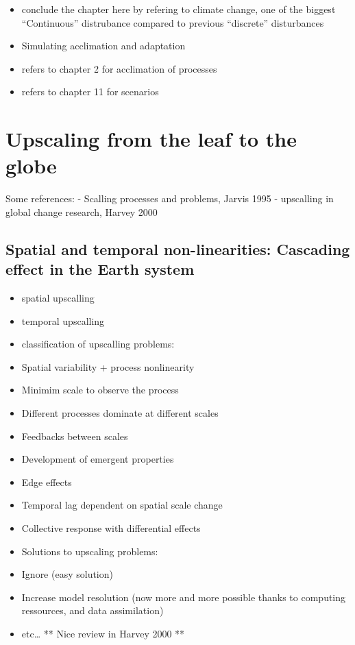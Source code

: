 \documentclass[12pt,oneside]{book}
\providecommand{\tightlist}{%
  \setlength{\itemsep}{0pt}\setlength{\parskip}{0pt}}
\begin{document}
\begin{itemize}
\tightlist
\item
  conclude the chapter here by refering to climate change, one of the
  biggest ``Continuous'' distrubance compared to previous ``discrete''
  disturbances
\item
  Simulating acclimation and adaptation
\item
  refers to chapter 2 for acclimation of processes
\item
  refers to chapter 11 for scenarios
\end{itemize}

\chapter{Upscaling from the leaf to the
globe}\label{upscaling-from-the-leaf-to-the-globe}

 Some references: - Scalling processes and problems,
Jarvis 1995 - upscalling in global change research, Harvey 2000

\section{Spatial and temporal non-linearities: Cascading effect in the
Earth
system}\label{spatial-and-temporal-non-linearities-cascading-effect-in-the-earth-system}

\begin{itemize}
\tightlist
\item
  spatial upscalling
\item
  temporal upscalling
\item
  classification of upscalling problems:
\item
  Spatial variability + process nonlinearity
\item
  Minimim scale to observe the process
\item
  Different processes dominate at different scales
\item
  Feedbacks between scales
\item
  Development of emergent properties
\item
  Edge effects
\item
  Temporal lag dependent on spatial scale change
\item
  Collective response with differential effects
\item
  Solutions to upscaling problems:
\item
  Ignore (easy solution)
\item
  Increase model resolution (now more and more possible thanks to
  computing ressources, and data assimilation)
\item
  etc\ldots{} ** Nice review in Harvey 2000 **
\end{itemize}
\end{document}
